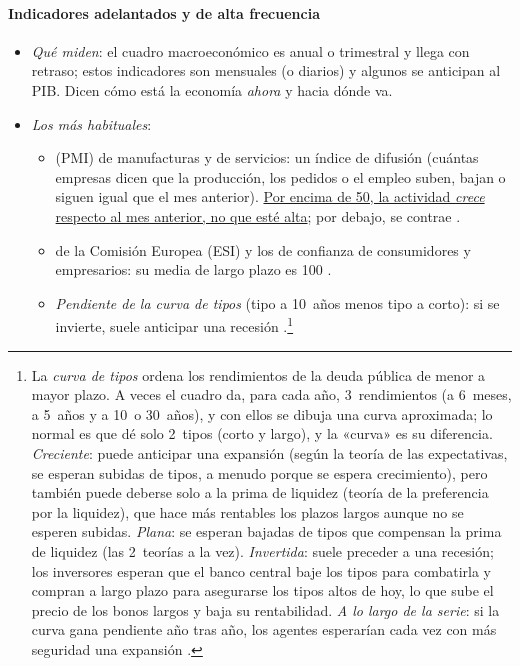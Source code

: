 \documentclass[11pt]{article}
\begin{document}
\paragraph{Indicadores adelantados y de alta frecuencia}
\begin{itemize}
\item \emph{Qué miden}: el cuadro macroeconómico es anual o trimestral y llega con retraso; estos indicadores son mensuales (o diarios) y algunos se anticipan al PIB. Dicen cómo está la economía \emph{ahora} y hacia dónde va.
\item \emph{Los más habituales}:
  \begin{itemize}
  \item {} (PMI) de manufacturas y de servicios: un índice de difusión (cuántas empresas dicen que la producción, los pedidos o el empleo suben, bajan o siguen igual que el mes anterior). \uline{Por encima de 50, la actividad \emph{crece} respecto al mes anterior, no que esté alta}; por debajo, se contrae \parencite{SPGlobalPMI}.
  \item {} de la Comisión Europea (ESI) y los de confianza de consumidores y empresarios: su media de largo plazo es 100 \parencite{CE2025Encuestas}.
  \item \emph{Pendiente de la curva de tipos} (tipo a 10~años menos tipo a corto): si se invierte, suele anticipar una recesión \parencite{EstrellaMishkin1998}.\footnote{La \emph{curva de tipos} ordena los rendimientos de la deuda pública de menor a mayor plazo. A veces el cuadro da, para cada año, 3~rendimientos (a 6~meses, a 5~años y a 10~o 30~años), y con ellos se dibuja una curva aproximada; lo normal es que dé solo 2~tipos (corto y largo), y la «curva» es su diferencia. \emph{Creciente}: puede anticipar una expansión (según la teoría de las expectativas, se esperan subidas de tipos, a menudo porque se espera crecimiento), pero también puede deberse solo a la prima de liquidez (teoría de la preferencia por la liquidez), que hace más rentables los plazos largos aunque no se esperen subidas. \emph{Plana}: se esperan bajadas de tipos que compensan la prima de liquidez (las 2~teorías a la vez). \emph{Invertida}: suele preceder a una recesión; los inversores esperan que el banco central baje los tipos para combatirla y compran a largo plazo para asegurarse los tipos altos de hoy, lo que sube el precio de los bonos largos y baja su rentabilidad. \emph{A lo largo de la serie}: si la curva gana pendiente año tras año, los agentes esperarían cada vez con más seguridad una expansión .}

\end{itemize}
\end{itemize}
\end{document}
